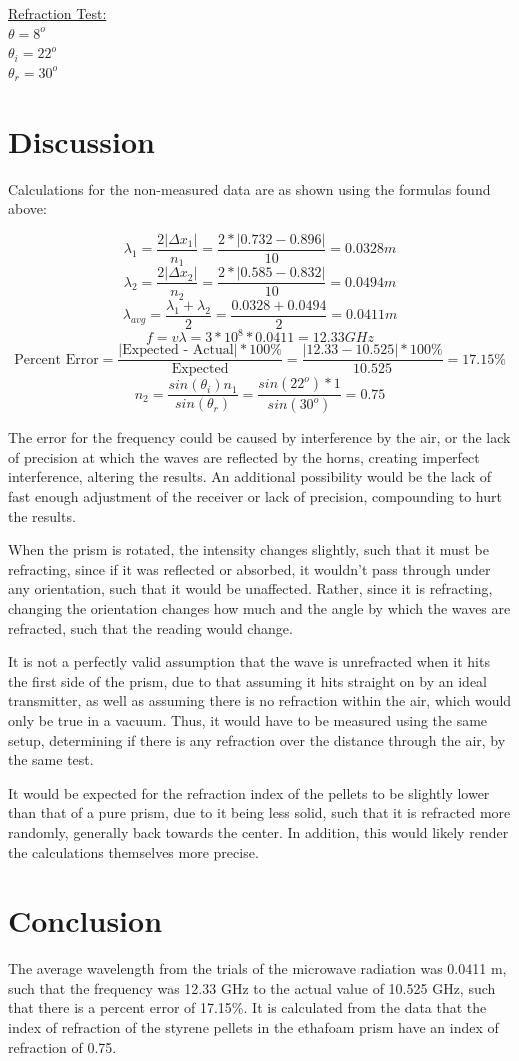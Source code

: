 \documentclass[11pt, titlepage]{article}
\begin{document}
\underline{Refraction Test:}\\
$\theta = 8^o$\\
$\theta_i = 22^o$\\
$\theta_r = 30^o$

\section*{Discussion}
Calculations for the non-measured data are as shown using the formulas found above:

$$\lambda_1 = \frac{2|\Delta x_1|}{n_1} = \frac{2*|0.732 - 0.896|}{10} = 0.0328 m$$
$$\lambda_2 = \frac{2|\Delta x_2|}{n_2} = \frac{2*|0.585 - 0.832|}{10} = 0.0494 m$$
$$\lambda_{avg} = \frac{\lambda_1 + \lambda_2}{2} = \frac{0.0328 + 0.0494}{2} = 0.0411 m$$
$$f = v\lambda = 3 * 10^8 * 0.0411 = 12.33 GHz$$
$$\text{Percent Error} = \frac{\text{$|$Expected - Actual$|$} * 100\%}{\text{Expected}} =\frac{|12.33 - 10.525| * 100\%}{10.525} = 17.15\%$$
$$n_2 = \frac{sin(\theta_i)n_1}{sin(\theta_r)} = \frac{sin(22^o)*1}{sin(30^o)} = 0.75$$

The error for the frequency could be caused by interference by the air, or the lack of precision at which the waves are reflected by the horns, creating imperfect interference, altering the results. An additional possibility would be the lack of fast enough adjustment of the receiver or lack of precision, compounding to hurt the results.

When the prism is rotated, the intensity changes slightly, such that it must be refracting, since if it was reflected or absorbed, it wouldn't pass through under any orientation, such that it would be unaffected. Rather, since it is refracting, changing the orientation changes how much and the angle by which the waves are refracted, such that the reading would change.

It is not a perfectly valid assumption that the wave is unrefracted when it hits the first side of the prism, due to that assuming it hits straight on by an ideal transmitter, as well as assuming there is no refraction within the air, which would only be true in a vacuum. Thus, it would have to be measured using the same setup, determining if there is any refraction over the distance through the air, by the same test.

It would be expected for the refraction index of the pellets to be slightly lower than that of a pure prism, due to it being less solid, such that it is refracted more randomly, generally back towards the center. In addition, this would likely render the calculations themselves more precise.

\section*{Conclusion}
The average wavelength from the trials of the microwave radiation was 0.0411 m, such that the frequency was 12.33 GHz to the actual value of 10.525 GHz, such that there is a percent error of 17.15\%. It is calculated from the data that the index of refraction of the styrene pellets in the ethafoam prism have an index of refraction of 0.75.
\end{document}
